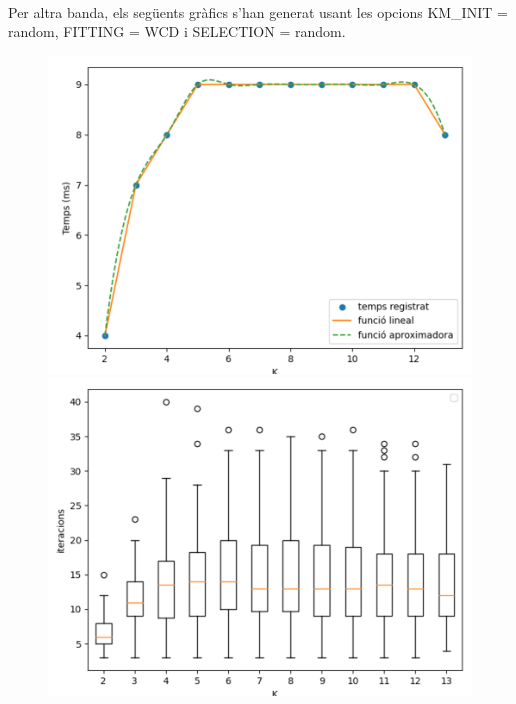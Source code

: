 \documentclass[a4paper, 11pt]{article}
\begin{document}
\begin{figure}[h!]
\begin{minipage}{.3\textwidth}
\end{minipage}
\end{figure}\\
Per altra banda, els següents gràfics s'han generat usant les opcions KM\_INIT = random, FITTING = WCD i SELECTION = random.
\label{fig:grafico}
\begin{figure}[h]
\begin{minipage}{.3\textwidth}
  \centering
  \includegraphics[width=.9\linewidth]{rnd_temps.png}
\end{minipage}%
\begin{minipage}{.3\textwidth}
  \centering
  \includegraphics[width=.9\linewidth]{rnd_iter.png}
\end{minipage}
\begin{minipage}{.3\textwidth}
  \centering

\end{minipage}
\end{figure}
\end{document}
